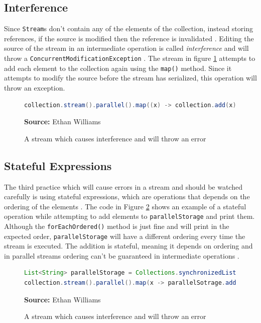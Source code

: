 \documentclass[oneside, 12pt]{article}
\newcommand{\source}[1]{\textbf{Source:} {#1} }
\begin{document}
\subsection{Interference}
Since \verb|Stream|s don't contain any of the elements of the collection, instead storing references, if the source is modified then the reference is invalidated \autocite{ibm_streams}. Editing the source of the stream in an intermediate operation is called \textit{interference} and will throw a \verb|ConcurrentModificationException| \autocite{parallelism_doc}. The stream in figure \ref{fig:interference} attempts to add each element to the collection again using the \verb|map()| method. Since it attempts to modify the source before the stream has serialized, this operation will throw an exception.

\begin{figure}[H]
\centering
\begin{lstlisting}[language=Java]
collection.stream().parallel().map((x) -> collection.add(x)).toArray();
\end{lstlisting}
\caption{A stream which causes interference and will throw an error}
\source{Ethan Williams}
\label{fig:interference}
\end{figure}

\subsection{Stateful Expressions} \label{stateful_expressions}
The third practice which will cause errors in a stream and should be watched carefully is using stateful expressions, which are operations that depends on the ordering of the elements \autocite{expression_state}. The code in Figure \ref{fig:stateful} shows an example of a stateful operation while attempting to add elements to \verb|parallelStorage| and print them. Although the \verb|forEachOrdered()| method is just fine and will print in the expected order, \verb|parallelStorage| will have a different ordering every time the stream is executed. The addition is stateful, meaning it depends on ordering and in parallel streams ordering can't be guaranteed in intermediate operations \autocite{parallelism_doc}.

\begin{figure}[H]
\centering
\begin{lstlisting}[language=Java]
List<String> parallelStorage = Collections.synchronizedList(new ArrayList<>());
collection.stream().parallel().map(x -> parallelSotrage.add(x)).forEachOrdered(x -> System.out.println(x));
\end{lstlisting}
\caption{A stream which causes interference and will throw an error}
\source{Ethan Williams}
\label{fig:stateful}
\end{figure}
 
\printbibliography[heading=bibintoc]
\end{document}

